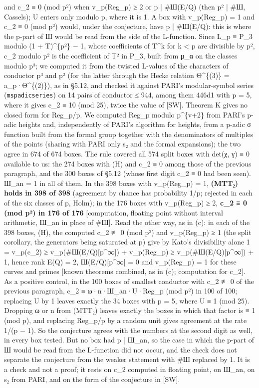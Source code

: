 \documentclass[11pt,a4paper]{article}
\theoremstyle{named}
\begin{document}
and c\_2 ≡ 0 (mod p²) when v\_p(Reg\_p) ≥ 2 or p | \#Ш(E/Q) (then p² | \#Ш, Cassels); U enters only modulo p, where it is 1. A box with v\_p(Reg\_p) = 1 and c\_2 ≡ 0 (mod p²) would, under the conjecture, have p | \#Ш(E/Q): this is where the p-part of Ш would be read from the side of the L-function. Since L\_p ≡ P\_3 modulo (1 + T)\textasciicircum{}\{p²\} − 1, whose coefficients of T\textasciicircum{}k for k \textless{} p are divisible by p², c\_2 modulo p² is the coefficient of T² in P\_3, built from μ\_α on the classes modulo p³; we computed it from the twisted L-values of the characters of conductor p³ and p² (for the latter through the Hecke relation Θ\textasciicircum{}\{(3)\} = a\_p·Θ\textasciicircum{}\{(2)\}), as in §5.12, and checked it against PARI's modular-symbol series (\texttt{mspadicseries}) on 14 pairs of conductor ≤ 944, among them 446d1 with p = 5, where it gives c\_2 ≡ 10 (mod 25), twice the value of [SW]. Theorem K gives no closed form for Reg\_p/p. We computed Reg\_p modulo p\textasciicircum{}\{v+2\} from PARI's p-adic heights and, independently of PARI's algorithm for heights, from a p-adic σ function built from the formal group together with the denominators of multiples of the points (sharing with PARI only s₂ and the formal expansions); the two agree in 674 of 674 boxes. The rule covered all 574 split boxes with det(χ, γ) ≡ 0 available to us: the 274 boxes with (H) and c\_2 ≡ 0 among those of the previous paragraph, and the 300 boxes of §5.12 (whose first digit c\_2 ≡ 0 had been seen). Ш\_an = 1 in all of them. In the 398 boxes with v\_p(Reg\_p) = 1, \textbf{(MTT₂) holds in 398 of 398} (agreement by chance has probability 1/p; rejected in each of the six classes of p, Holm); in the 176 boxes with v\_p(Reg\_p) ≥ 2, \textbf{c\_2 ≡ 0 (mod p²) in 176 of 176} [computation, floating point without interval arithmetic, Ш\_an in place of \#Ш]. Read the other way, as in (c): in each of the 398 boxes, (H), the computed c\_2 ≢ 0 (mod p²) and v\_p(Reg\_p) ≥ 1 (the split corollary, the generators being saturated at p) give by Kato's divisibility alone 1 = v\_p(c\_2) ≥ v\_p(\#Ш(E/Q)[p\textasciicircum{}∞]) + v\_p(Reg\_p) ≥ v\_p(\#Ш(E/Q)[p\textasciicircum{}∞]) + 1, hence rank E(Q) = 2, Ш(E/Q)[p\textasciicircum{}∞] = 0 and v\_p(Reg\_p) = 1 for these curves and primes [known theorems combined, as in (c); computation for c\_2]. As a positive control, in the 100 boxes of smallest conductor with c\_2 ≢ 0 of the previous paragraph, c\_2 ≡ ω·n·Ш\_an·U·Reg\_p (mod p²) in 100 of 100; replacing U by 1 leaves exactly the 34 boxes with p = 5, where U ≡ 1 (mod 25). Dropping ω or n from (MTT₂) leaves exactly the boxes in which that factor is ≡ 1 (mod p), and replacing Reg\_p/p by a random unit gives agreement at the rate 1/(p − 1). So the conjecture agrees with the numbers at the second digit as well, in every box tested. But no box had p | Ш\_an, so the case in which the p-part of Ш would be read from the L-function did not occur, and the check does not separate the conjecture from the weaker statement with \#Ш replaced by 1. It is a check and not a proof; it rests on c\_2 computed in floating point, on Ш\_an, on s₂ from PARI, and on the form of the conjecture in [SW].
\end{document}
